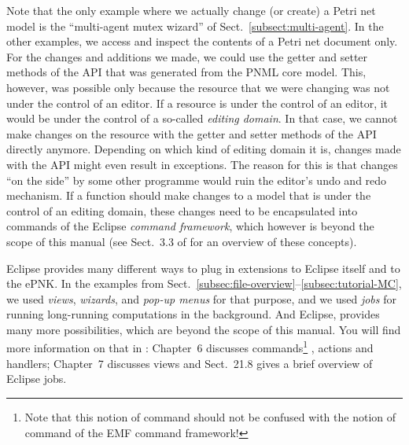 Note that the only example where we actually change (or create) a Petri net
model is the ``multi-agent mutex wizard'' of Sect.~\ref{subsect:multi-agent}. In
the other examples, we access and inspect the contents of a Petri net document only. For
the changes and additions we made, we could use the getter and setter methods of
the API that was generated from the PNML core model. This, however, was possible
only because the resource that we were changing was not under the control of an
editor. If a resource is under the control of an editor, it would be
under the control of a so-called \emph{editing domain}.%
In that case, we cannot make changes on the resource with the getter and setter
methods of the API directly anymore. Depending on which kind of editing domain
it is, changes made with the API might even result in exceptions. The reason for
this is that changes ``on the side'' by some other programme would ruin the
editor's undo and redo mechanism. If a function should make changes to a model
that is under the control of an editing domain, these changes need to be
encapsulated into commands of the Eclipse \emph{command framework},%
which however is beyond the scope of this manual (see Sect.~3.3 of \cite{BSM06}
for an overview of these concepts). 

Eclipse provides many different ways to plug in extensions to Eclipse itself and to
the ePNK. In the examples from Sect.~\ref{subsec:file-overview}--\ref{subsec:tutorial-MC},
we used \emph{views}, \emph{wizards}, and \emph{pop-up menus} for that purpose, and
we used \emph{jobs} for running long-running computations in the background. And Eclipse,
provides many more possibilities, which are beyond the scope of this manual. You will
find more information on that in \cite{ClRu08}: Chapter~6 discusses commands\footnote
  {Note that this notion of command should not be confused with the notion
   of command of the EMF command framework!}%
, actions and handlers; Chapter~7 discusses views and Sect.~21.8 gives a brief
overview of Eclipse jobs.

